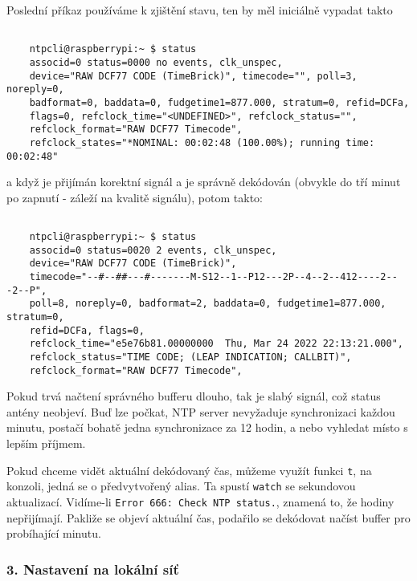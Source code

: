     \noindent Poslední příkaz používáme k zjištění stavu, ten by měl iniciálně vypadat takto

    {\scriptsize

    \begin{lstlisting}

    ntpcli@raspberrypi:~ $ status
    associd=0 status=0000 no events, clk_unspec,
    device="RAW DCF77 CODE (TimeBrick)", timecode="", poll=3, noreply=0,
    badformat=0, baddata=0, fudgetime1=877.000, stratum=0, refid=DCFa,
    flags=0, refclock_time="<UNDEFINED>", refclock_status="",
    refclock_format="RAW DCF77 Timecode",
    refclock_states="*NOMINAL: 00:02:48 (100.00%); running time: 00:02:48"

    \end{lstlisting}
    }

    a když je přijímán korektní signál a je správně dekódován (obvykle do tří minut po
    zapnutí - záleží na kvalitě signálu), potom takto:

    {\scriptsize

    \begin{lstlisting}

    ntpcli@raspberrypi:~ $ status
    associd=0 status=0020 2 events, clk_unspec,
    device="RAW DCF77 CODE (TimeBrick)",
    timecode="--#--##---#-------M-S12--1--P12---2P--4--2--412----2---2--P",
    poll=8, noreply=0, badformat=2, baddata=0, fudgetime1=877.000, stratum=0,
    refid=DCFa, flags=0,
    refclock_time="e5e76b81.00000000  Thu, Mar 24 2022 22:13:21.000",
    refclock_status="TIME CODE; (LEAP INDICATION; CALLBIT)",
    refclock_format="RAW DCF77 Timecode",

    \end{lstlisting}
    }

    Pokud trvá načtení správného bufferu dlouho, tak je slabý signál, což status antény
    neobjeví. Buď lze počkat, NTP server nevyžaduje synchronizaci každou minutu, postačí
    bohatě jedna synchronizace za 12 hodin, a nebo vyhledat místo s lepším příjmem.

    Pokud chceme vidět aktuální dekódovaný čas, můžeme využít funkci \verb|t|, na konzoli,
    jedná se o předvytvořený alias. Ta spustí
    \verb|watch| se sekundovou aktualizací. Vidíme-li \verb|Error 666: Check NTP status.|,
    znamená to, že hodiny nepřijímají. Pakliže se objeví aktuální čas, podařilo se
    dekódovat načíst buffer pro probíhající minutu.

\subsubsection{3. Nastavení na lokální síť}

